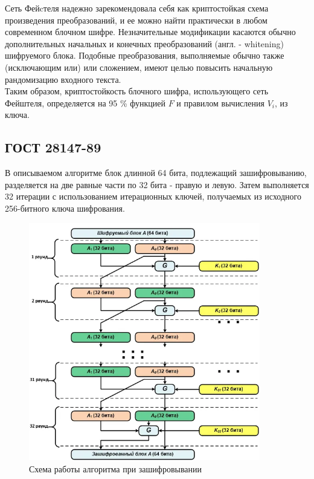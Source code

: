 \documentclass[oneside,final,14pt]{extreport}
\begin{document}
Сеть Фейcтеля надежно зарекомендовала себя как крипто­стойкая схема произведения преобразований, и ее можно найти
практически в любом современном блочном шифре. Незначительные
модификации касаются обычно дополнительных начальных и конеч­ных преобразований (англ. - whitening) шифруемого блока. Подобные
преобразования, выполняемые обычно также (исключающим или)  или сложением, имеют целью повысить начальную рандомизацию
входного текста. \\

Таким образом, криптостойкость блочного шифра,
использующего сеть Фейштеля, определяется на 95 \% функцией $F$ и
правилом вычисления $V_{i}$, из ключа.\\

\begin{center}
\subsection{ГОСТ 28147-89}
 \end{center}

В описываемом алгоритме блок длинной 64 бита, подлежащий зашифровыванию, разделяется на две равные части по 32 бита - правую и левую. Затем выполняется 32 итерации с использованием итерационных ключей, получаемых из исходного 256-битного ключа шифрования.


\begin{figure}[h!]
\includegraphics[width=0.9\textwidth]{2.png}
\caption{Схема работы алгоритма при зашифровывании}
\end{figure}
\end{document}
